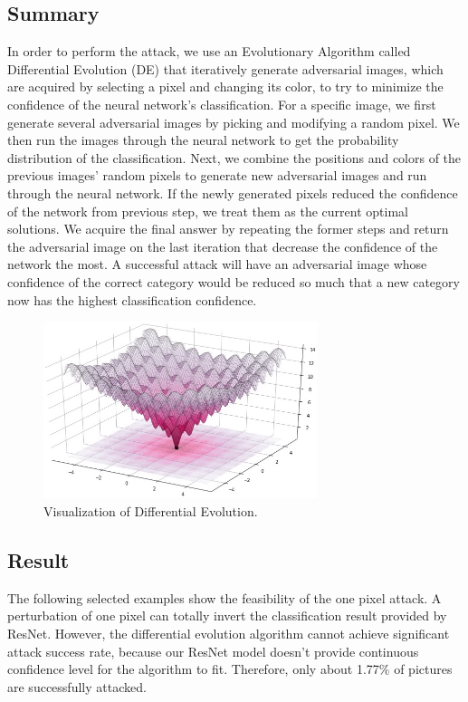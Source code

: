 \documentclass{article}
\begin{document}
\subsection{Summary}
In order to perform the attack, we use an Evolutionary Algorithm called Differential Evolution (DE) that iteratively generate adversarial images, which are acquired by selecting a pixel and changing its color, to try to minimize the confidence of the neural network's classification. For a specific image, we first generate several adversarial images by picking and modifying a random pixel. We then run the images through the neural network to get the probability distribution of the classification. Next, we combine the positions and colors of the previous images' random pixels to generate new adversarial images and run through the neural network. If the newly generated pixels reduced the confidence of the network from previous step, we treat them as the current optimal solutions. We acquire the final answer by repeating the former steps and return the adversarial image on the last iteration that decrease the confidence of the network the most. A successful attack will have an adversarial image whose confidence of the correct category would be reduced so much that a new category now has the highest classification confidence. \cite{github}
\begin{figure}[h]
	\centering
    \includegraphics[width=8cm]{Ackley.jpg}
    \caption{Visualization of Differential Evolution.}
\end{figure}


\subsection{Result}
The following selected examples show the feasibility of the one pixel attack. A perturbation of one pixel can totally invert the classification result provided by ResNet. However, the differential evolution algorithm cannot achieve significant attack success rate, because our ResNet model doesn't provide continuous confidence level for the algorithm to fit. Therefore, only about 1.77\% of pictures are successfully attacked. 
\end{document}
